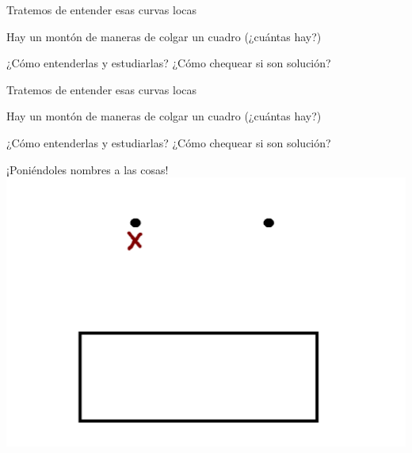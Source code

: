 \documentclass[11pt]{beamer}
\begin{document}
\begin{frame}{Tratemos de entender esas curvas locas}

	Hay un montón de maneras de colgar un cuadro (¿cuántas hay?)
	
	¿Cómo entenderlas y estudiarlas? ¿Cómo chequear si son solución?
%	
%	


\end{frame}

\begin{frame}{Tratemos de entender esas curvas locas}

	Hay un montón de maneras de colgar un cuadro (¿cuántas hay?)
	
	¿Cómo entenderlas y estudiarlas? ¿Cómo chequear si son solución?


	\Large{¡Poniéndoles nombres a las cosas!}
	\includegraphics[scale=0.35]{images/_x.png}

\end{frame}
\end{document}
